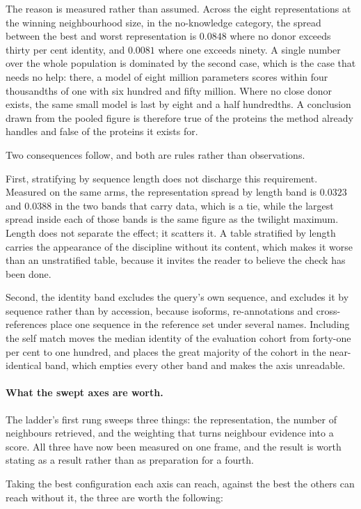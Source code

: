 The reason is measured rather than assumed. Across the eight
representations at the winning neighbourhood size, in the no-knowledge
category, the spread between the best and worst representation is
$0.0848$ where no donor exceeds thirty per cent identity, and $0.0081$
where one exceeds ninety. A single number over the whole population is
dominated by the second case, which is the case that needs no help: there,
a model of eight million parameters scores within four thousandths of one
with six hundred and fifty million. Where no close donor exists, the same
small model is last by eight and a half hundredths. A conclusion drawn from
the pooled figure is therefore true of the proteins the method already
handles and false of the proteins it exists for.

Two consequences follow, and both are rules rather than observations.

First, stratifying by sequence length does not discharge this requirement.
Measured on the same arms, the representation spread by length band is
$0.0323$ and $0.0388$ in the two bands that carry data, which is a tie,
while the largest spread inside each of those bands is the same figure as
the twilight maximum. Length does not separate the effect; it scatters it.
A table stratified by length carries the appearance of the discipline
without its content, which makes it worse than an unstratified table,
because it invites the reader to believe the check has been done.

Second, the identity band excludes the query's own sequence, and excludes
it by sequence rather than by accession, because isoforms, re-annotations
and cross-references place one sequence in the reference set under several
names. Including the self match moves the median identity of the evaluation
cohort from forty-one per cent to one hundred, and places the great
majority of the cohort in the near-identical band, which empties every
other band and makes the axis unreadable.

\paragraph{What the swept axes are worth.}
The ladder's first rung sweeps three things: the representation, the
number of neighbours retrieved, and the weighting that turns neighbour
evidence into a score. All three have now been measured on one frame, and
the result is worth stating as a result rather than as preparation for a
fourth.

Taking the best configuration each axis can reach, against the best the
others can reach without it, the three are worth the following:

